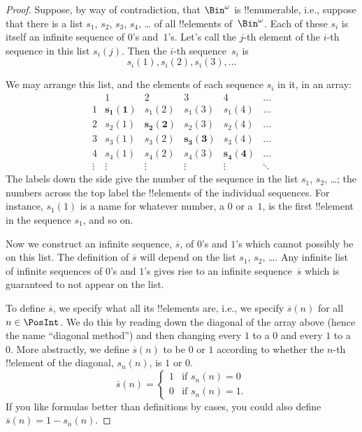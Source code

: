 \documentclass[../../../include/open-logic-section]{subfiles}
\begin{document}
\begin{proof}
Suppose, by way of contradiction, that $\Bin^\omega$ is
!!{enumerable}, i.e., suppose that there is a list $s_{1}$, $s_{2}$,
$s_{3}$, $s_{4}$, \dots{} of all !!{element}s of~$\Bin^\omega$.  Each
of these $s_i$ is itself an infinite sequence of $0$'s and~$1$'s.
Let's call the $j$-th element of the $i$-th sequence in this list
$s_i(j)$. Then the $i$-th sequence~$s_i$ is
\[
s_i(1), s_i(2), s_i(3), \dots
\]

We may arrange this list, and the elements of each sequence $s_i$ in
it, in an array:
\[
\begin{array}{c|c|c|c|c|c}
& 1 & 2 & 3 & 4 & \dots \\\hline
1 & \mathbf{s_{1}(1)} & s_{1}(2) & s_{1}(3) & s_1(4) & \dots \\\hline
2 & s_{2}(1)& \mathbf{s_{2}(2)} & s_2(3) & s_2(4) & \dots \\\hline
3 & s_{3}(1)& s_{3}(2) & \mathbf{s_3(3)} & s_3(4) & \dots \\\hline
4 & s_{4}(1)& s_{4}(2) & s_4(3) & \mathbf{s_4(4)} & \dots \\\hline
\vdots & \vdots & \vdots & \vdots & \vdots & \mathbf{\ddots}
\end{array}
\]
The labels down the side give the number of the sequence in the list
$s_1$, $s_2$, \dots; the numbers across the top label the !!{element}s
of the individual sequences. For instance, $s_{1}(1)$ is a name for
whatever number, a $0$ or a~$1$, is the first !!{element} in the
sequence $s_{1}$, and so on.

Now we construct an infinite sequence, $\overline{s}$, of $0$'s and
$1$'s which cannot possibly be on this list.  The definition of
$\overline{s}$ will depend on the list $s_1$, $s_2$, \dots.  Any
infinite list of infinite sequences of $0$'s and $1$'s gives rise to
an infinite sequence~$\overline{s}$ which is guaranteed to not appear
on the list.

To define $\overline{s}$, we specify what all its !!{element}s are,
i.e., we specify $\overline{s}(n)$ for all $n \in \PosInt$.  We do this
by reading down the diagonal of the array above (hence the name
``diagonal method'') and then changing every $1$ to a $0$ and every
$1$ to a~$0$. More abstractly, we define $\overline{s}(n)$ to be $0$
or $1$ according to whether the $n$-th !!{element} of the diagonal,
$s_n(n)$, is $1$ or $0$.
\[
\overline{s}(n) =
\begin{cases}
1 & \text{if $s_{n}(n) = 0$}\\
0 & \text{if $s_{n}(n) = 1$}.
\end{cases}
\]
If you like formulas better than definitions by cases, you could also
define $\overline{s}(n) = 1 - s_n(n)$.


\end{proof}
\end{document}
